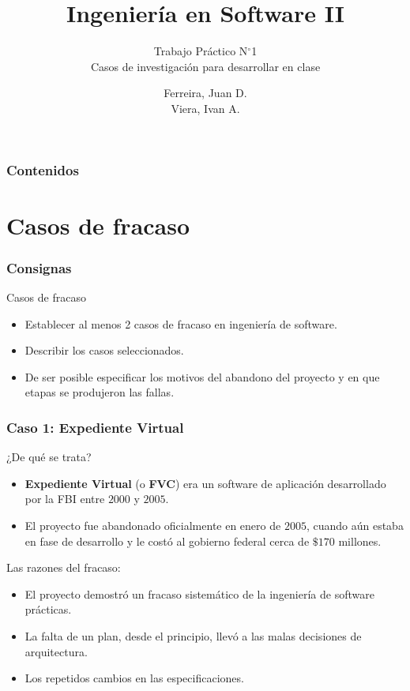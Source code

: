 \documentclass[11pt]{beamer}
\title{Ingeniería en Software II}
\subtitle[Ed/Ing]{Trabajo Práctico N$^{\circ}$1\\ 
	Casos de investigación para desarrollar en clase}
\author{Ferreira, Juan D.\\ %
	    Viera, Ivan A.      %
}
\begin{document}
	\begin{frame} %
		\titlepage
	\end{frame}

	\begin{frame}
		\frametitle{Contenidos}
		\tableofcontents[pausesections]
	\end{frame}

	\section[Casos de fracaso]{Casos de fracaso}
	\begin{frame}
		\frametitle{Consignas}
		\begin{block}{Casos de fracaso}
			\begin{itemize}
				\item Establecer al menos 2 casos de fracaso en ingeniería de software.
				\item Describir los casos seleccionados.
				\item De ser posible especificar los motivos del abandono del proyecto y en que etapas se produjeron
				las fallas.
			\end{itemize}
		\end{block}
	\end{frame}

	\begin{frame}
		\frametitle{Caso 1: Expediente Virtual}
		\begin{block}{¿De qué se trata?}
			\begin{itemize}
				\item \textbf{Expediente Virtual} (o \textbf{FVC}) era un software de aplicación desarrollado por la FBI entre $2000$ y $2005$.
				\item El proyecto fue abandonado oficialmente en enero de $2005$, cuando aún estaba en fase de desarrollo y le costó al gobierno federal cerca de $\$170$ millones.
			\end{itemize}
		\end{block}
		\pause
		\begin{block}{Las razones del fracaso:}
			\begin{itemize}
				\item El proyecto demostró un fracaso sistemático de la ingeniería de software prácticas.
				\item La falta de un plan, desde el principio, llevó a las malas decisiones de arquitectura.
				\item Los repetidos cambios en las especificaciones.
			\end{itemize}
		\end{block}
	\end{frame}
\end{document}
